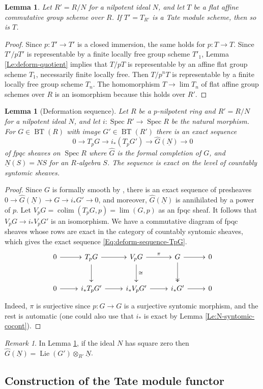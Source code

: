 \documentclass[a4paper,11pt]{amsart}
\theoremstyle{plain}
\newtheorem{Lemma}[equation]{Lemma}
\theoremstyle{definition}
\theoremstyle{remark}
\newtheorem{Remark}[equation]{Remark}
\newcommand{\bLe}{\begin{Lemma}}
\newcommand{\eLe}{\end{Lemma}}
\newcommand{\bRe}{\begin{Remark}}
\newcommand{\eRe}{\end{Remark}}
\newcommand{\bproof}{\begin{proof}}
\newcommand{\eproof}{\end{proof}}
\newcommand{\beqn}{\begin{equation}}
\newcommand{\eeqn}{\end{equation}}
\renewcommand{\u}{\underline}
\numberwithin{equation}{section}
\DeclareMathOperator{\colim}{colim}
\DeclareMathOperator{\BT}{BT}
\DeclareMathOperator{\Lie}{Lie}
\DeclareMathOperator{\Spec}{Spec}
\begin{document}
\bLe
\label{Le:deform-Tate-module-scheme}
Let $R'=R/N$ for a nilpotent ideal $N$, and let $T$ be a flat affine commutative group scheme over $R$. If $T'=T_{R'}$ is a Tate module scheme, then so is $T$.
\eLe

\bproof
Since $p\colon T'\to T'$ is a closed immersion, the same holds for $p\colon T\to T$. Since $T'/pT'$ is representable by a finite locally free group scheme $T'_1$, Lemma \ref{Le:deform-quotient} implies that $T/pT$ is representable by an affine flat group scheme $T_1$, necessarily finite locally free.
Then $T/p^nT$ is representable by a finite locally free group scheme $T_n$. The homomorphism $T\to\lim T_n$ of flat affine group schemes over $R$ is an isomorphism because this holds over $R'$.
\eproof

\bLe[Deformation sequence]
\label{Le:deform-sequence-TpG}
Let $R$ be a $p$-nilpotent ring and $R'=R/N$ for a nilpotent ideal $N$, 
and let $i\colon \Spec R'\to \Spec R$ be the natural morphism.
For $G\in\BT(R)$ with image $G'\in\BT(R')$ there is an exact sequence
\beqn
\label{Eq:deform-sequence-TpG}
0\to T_pG\to i_*(T_pG')\to \hat G(\u N)\to 0
\eeqn
of fpqc sheaves on $\Spec R$ where $\hat G$ is the formal completion of $G$, and $\u N(S)=NS$ for an $R$-algebra $S$. The sequence is exact on the level of countably syntomic sheaves.
\eLe

\bproof
Since  $G$ is formally smooth by \cite[Chap.~I, Theorem 3.3.13]{Messing:Crystals}, there is an exact sequence of presheaves $0\to\hat G(\u N)\to G\to i_*G'\to 0$, and moreover, $\hat G(\u N)$ is annihilated by a power of $p$. Let $V_pG=\colim(T_pG,p)=\lim(G,p)$ as an fpqc sheaf. It follows that $V_pG\to i_*V_pG'$ is an isomorphism.
We have a commutative diagram of fpqc sheaves whose rows are exact in the category of countably syntomic sheaves, which gives the exact sequence \eqref{Eq:deform-sequence-TpG}.
\beqn
\label{Eq:deform-sequence-TpG-diag}
\xymatrix@M+0.2em{
0 \ar[r] & T_pG \ar[d] \ar[r] & V_pG \ar[d]^\cong \ar[r]^-\pi & G \ar@{->>}[d] \ar[r] & 0 \\
0 \ar[r] & i_*T_pG' \ar[r] & i_*V_pG' \ar[r] & i_*G' \ar[r] & 0 
}
\eeqn
Indeed, $\pi$ is surjective since $p\colon G\to G$ is a surjective syntomic morphism, and the rest is automatic (one could also use that $i_*$ is exact by Lemma \ref{Le:N-syntomic-cocont}). 
\eproof

\bRe
In Lemma \ref{Le:deform-sequence-TpG}, if the ideal $N$ has square zero then $\hat G(\u N)=\Lie(G')\otimes_{R'}\u N$.
\eRe

\subsection{Construction of the Tate module functor}
\label{Se:Tate:constr}
\end{document}
